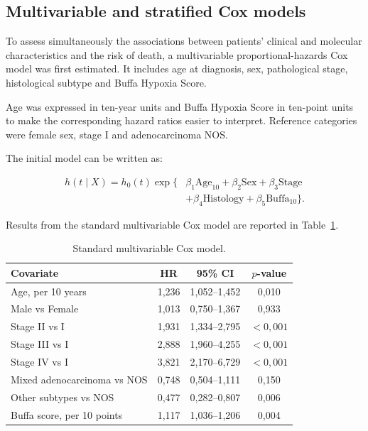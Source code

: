 \documentclass[12pt,a4paper]{article}
\begin{document}
\subsection{Multivariable and stratified Cox models}

To assess simultaneously the associations between patients' clinical and molecular characteristics and the risk of death, a multivariable proportional-hazards Cox model was first estimated. It includes age at diagnosis, sex, pathological stage, histological subtype and Buffa Hypoxia Score.

Age was expressed in ten-year units and Buffa Hypoxia Score in ten-point units to make the corresponding hazard ratios easier to interpret. Reference categories were female sex, stage I and adenocarcinoma NOS.

The initial model can be written as:

\begin{equation}
\begin{split}
h(t \mid X)=h_0(t)\exp\{&
\beta_1 \mathrm{Age}_{10}
+\beta_2 \mathrm{Sex}
+\beta_3 \mathrm{Stage} \\
&+\beta_4 \mathrm{Histology}
+\beta_5 \mathrm{Buffa}_{10}\}.
\end{split}
\label{eq:cox_standard}
\end{equation}

Results from the standard multivariable Cox model are reported in Table~\ref{tab:cox_standard}.

\begin{table}[H]
\centering
\caption{Standard multivariable Cox model.}
\label{tab:cox_standard}
\renewcommand{\arraystretch}{1.15}
\small
\begin{tabular}{l c c c}
\toprule
\textbf{Covariate}
& \textbf{HR}
& \textbf{95\% CI}
& \textbf{$p$-value} \\
\midrule
Age, per 10 years
& 1,236
& 1,052--1,452
& 0,010 \\

Male vs Female
& 1,013
& 0,750--1,367
& 0,933 \\

Stage II vs I
& 1,931
& 1,334--2,795
& $<0,001$ \\

Stage III vs I
& 2,888
& 1,960--4,255
& $<0,001$ \\

Stage IV vs I
& 3,821
& 2,170--6,729
& $<0,001$ \\

Mixed adenocarcinoma vs NOS
& 0,748
& 0,504--1,111
& 0,150 \\

Other subtypes vs NOS
& 0,477
& 0,282--0,807
& 0,006 \\

Buffa score, per 10 points
& 1,117
& 1,036--1,206
& 0,004 \\
\bottomrule
\end{tabular}
\end{table}
\end{document}
